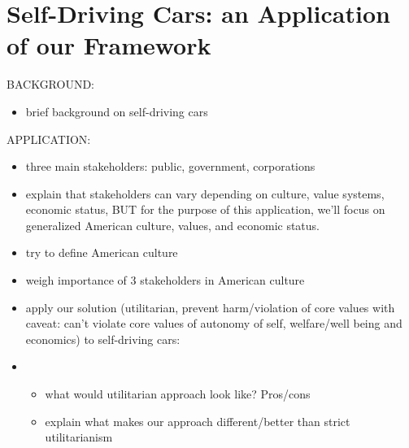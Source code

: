 \section{Self-Driving Cars: an Application of our Framework}
\label{sec:-application}

{\large BACKGROUND:}
\begin{itemize}
  \item brief background on self-driving cars
\end{itemize}
{\large APPLICATION:}
\begin{itemize}
  \item three main stakeholders: public, government, corporations
  \item explain that stakeholders can vary depending on culture, 
    value systems, economic status, BUT for the purpose of this 
    application, we’ll focus on generalized American culture, 
    values, and economic status.
  \item try to define American culture
  \item weigh importance of 3 stakeholders in American culture
\end{itemize}


\begin{itemize}
  \item apply our solution (utilitarian, prevent harm/violation of core 
    values with caveat: can’t violate core values of autonomy of self, 
    welfare/well being and economics) to self-driving cars:
  \item 
    \begin{itemize}
      \item what would utilitarian approach look like? Pros/cons
      \item explain what makes our approach different/better than strict utilitarianism
    \end{itemize}
\end{itemize}

